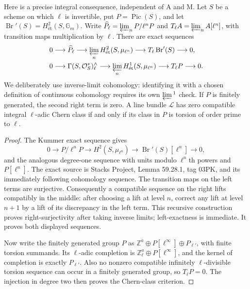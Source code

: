\documentclass[11pt,a4paper]{article}
\begin{document}
Here is a precise integral consequence, independent of A and M. Let $S$
be a scheme on which $\ell$ is invertible, put $P=\operatorname{Pic}(S)$,
and let $\operatorname{Br}'(S)=H^2_{\text{ét}}(S,\mathbb G_m)$.
Write $\widehat P_\ell=\varprojlim_nP/\ell^nP$ and
$T_\ell A=\varprojlim_n A[\ell^n]$, with transition maps multiplication
by $\ell$. There are exact sequences
\begin{align*}
 0&\longrightarrow\widehat P_\ell
   \longrightarrow\varprojlim_nH^2_{\text{ét}}(S,\mu_{\ell^n})
   \longrightarrow T_\ell\operatorname{Br}'(S)\longrightarrow0,\\
 0&\longrightarrow\Gamma(S,\mathcal O_S^*)^{\wedge}_\ell
   \longrightarrow\varprojlim_nH^1_{\text{ét}}(S,\mu_{\ell^n})
   \longrightarrow T_\ell P\longrightarrow0.
\end{align*}
We deliberately use inverse-limit cohomology: identifying it with a
chosen definition of continuous cohomology requires its own
$\varprojlim{}^1$ check. If $P$ is finitely generated, the second right
term is zero. A line bundle $\mathcal L$ has zero compatible integral
$\ell$-adic Chern class if and only if its class in $P$ is torsion of
order prime to $\ell$.

\begin{proof}
The Kummer exact sequence gives
\[
 0\longrightarrow P/\ell^nP
 \longrightarrow H^2(S,\mu_{\ell^n})
 \longrightarrow\operatorname{Br}'(S)[\ell^n]\longrightarrow0,
\]
and the analogous degree-one sequence with units modulo $\ell^n$th
powers and $P[\ell^n]$. The exact source is Stacks Project,
Lemma 59.28.1, tag 03PK, and its immediately following cohomology
sequence. The transition maps on the left terms are surjective.
Consequently a compatible sequence on the right lifts compatibly in
the middle: after choosing a lift at level $n$, correct any lift at
level $n+1$ by a lift of its discrepancy in the left term. This recursive
construction proves right-surjectivity after taking inverse limits;
left-exactness is immediate. It proves both displayed sequences.

Now write the finitely generated group $P$ as
$\mathbb Z^a\oplus P[\ell^\infty]\oplus P_{\ell'}$, with finite torsion
summands. Its $\ell$-adic completion is
$\mathbb Z_\ell^a\oplus P[\ell^\infty]$, and the kernel of completion
is exactly $P_{\ell'}$. Also no nonzero compatible infinitely
$\ell$-divisible torsion sequence can occur in a finitely generated
group, so $T_\ell P=0$. The injection in degree two then proves the
Chern-class criterion.
\end{proof}
\end{document}
